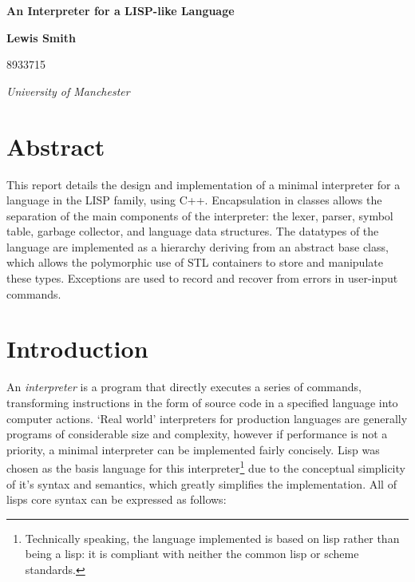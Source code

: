 \documentclass[12pt]{article}
\begin{document}
\lstset{language=Lisp}


\thispagestyle{empty}

\vspace*{15mm}

\begin{center}
{\Large\bf
An Interpreter for a LISP-like Language
}

\vspace*{5mm}

\end{center}
\vspace*{5mm} \noindent
\vskip 0.5cm
\centerline{\bf
Lewis Smith
}
\centerline{
8933715
}

\vskip 5mm
\vskip 5mm
\centerline{\em University of Manchester }

\vskip 20mm
\vskip 20mm
\section*{Abstract}




This report details the design and implementation of a minimal
interpreter for a language in the LISP family, using C++. Encapsulation
in classes allows the separation of the main components of the
interpreter: the lexer, parser, symbol table, garbage collector, and
language data structures. The datatypes of the language are
implemented as a hierarchy deriving from an abstract base class, which
allows the polymorphic use of STL containers to store and manipulate
these types. Exceptions are used to record and recover from errors in
user-input commands.

 
\section{ Introduction }

An \textit{interpreter} is a program that directly executes a series
of commands, transforming instructions in the form of source code in a
specified language into computer actions. `Real world' interpreters
for production languages are generally programs of considerable size
and complexity, however if performance is not a priority, a minimal
interpreter can be implemented fairly concisely. Lisp was chosen as
the basis language for this interpreter\footnote{Technically speaking,
the language implemented is based on lisp rather than being a lisp: it
is compliant with neither the common lisp or scheme standards.} due to
the conceptual simplicity of it's syntax and semantics, which greatly
simplifies the implementation. All of lisps core syntax can be
expressed as follows:
\end{document}
